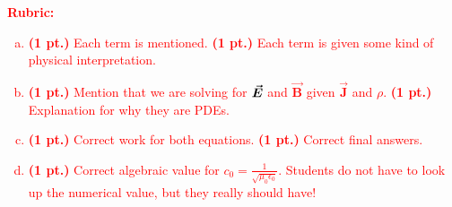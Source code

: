 \documentclass[12pt]{article} %
\newcommand{\vecfieldB}{\boldsymbol{\vec{B}}}
\newcommand{\vecfieldJ}{\boldsymbol{\vec{J}}}
\begin{document}
\vspace*{1cm}
\textcolor{red}{
\noindent \textbf{Rubric:}
\begin{enumerate}[(a)]
    \item \textbf{(1 pt.)} Each term is mentioned. \textbf{(1 pt.)} Each term is given some kind of physical interpretation.
    \item \textbf{(1 pt.)} Mention that we are solving for $\boldsymbol{\vec{E}}$ and $\vecfieldB$ given $\vecfieldJ$ and $\rho$. \textbf{(1 pt.)} Explanation for why they are PDEs.
    \item \textbf{(1 pt.)} Correct work for both equations. \textbf{(1 pt.)} Correct final answers.
	\item \textbf{(1 pt.)} Correct algebraic value for $c_0 = \frac{1}{\sqrt{\mu_0 \epsilon_0}}$. Students do not have to look up the numerical value, but they really should have!
\end{enumerate}
}
\end{document}
